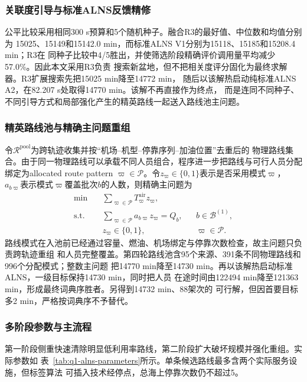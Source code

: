 \documentclass[UTF8,a4paper,zihao=5]{ctexart}
\begin{document}
\subsubsection{关联度引导与标准ALNS反馈精修}

公平比较采用相同300 s预算和5个随机种子。融合R3的最好值、中位数和均值分别为
15025、15149和15142.0 min，而标准ALNS V1分别为15118、15185和15208.4 min；R3在
同种子比较中4/5胜出，并使筛选阶段精确评价调用量平均减少57.0\%。因此本文采用R3负责
搜索新盆地，但不把相关度评分固化为最终求解器。R3扩展搜索先把15025 min降至14772 min，
随后以该解热启动纯标准ALNS A2，在82.207 s处取得14770 min。该解不再直接作为终点，
而是连同不同种子、不同引导方式和局部强化产生的精英路线一起送入路线池主问题。

\subsubsection{精英路线池与精确主问题重组}

令$\mathcal R^{\mathrm{pool}}$为跨轨迹收集并按“机场--机型--停靠序列--加油位置”去重后的
物理路线集合。由于同一物理路线可以承载不同人员组合，程序进一步把路线与可行人员分配
绑定为allocated route pattern $\varpi\in\mathcal P$。令$z_{\varpi}\in\{0,1\}$表示是否采用模式$\varpi$，
$a_{b\varpi}$表示模式$\varpi$覆盖批次$b$的人数，则精确主问题为
\begin{align}
  \min\quad &\sum_{\varpi\in\mathcal P}T_{\varpi}^{\mathrm{air}}z_{\varpi},
  \label{eq:q1-pool-master-objective}\\
  \text{s.t.}\quad &\sum_{\varpi\in\mathcal P}a_{b\varpi}z_{\varpi}=Q_b,
  &&b\in\mathcal B^{(1)},\label{eq:q1-pool-master-cover}\\
  &z_{\varpi}\in\{0,1\},&&\varpi\in\mathcal P.
\end{align}
路线模式在入池前已经通过容量、燃油、机场绑定与停靠次数检查，故主问题只负责跨轨迹重组
和人员完整覆盖。第四轮路线池含95个来源、391条不同物理路线和996个分配模式；整数主问题
把14770 min降至14730 min。再以该解热启动标准ALNS，一级目标保持14730 min，同时把人员
在途时间由122494 min降至121363 min，形成最终词典序胜者。另得到14732 min、88架次的
可行解，但因首要目标多2 min，严格按词典序不予替代。

\subsubsection{多阶段参数与主流程}

第一阶段侧重快速清除明显低利用率路线，第二阶段扩大破坏规模并强化重组。实际参数如
表~\ref{tab:q1-alns-parameters}所示。单条候选路线最多含两个实际服务设施，但标签算法
可插入技术经停点，总海上停靠次数仍不超过5。
\end{document}
